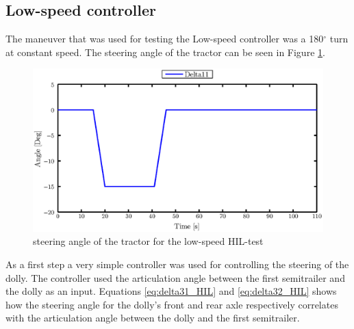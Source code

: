 \documentclass[ExampleMasters.tex]{subfiles}
\begin{document}
%	

\subsection{Low-speed controller}
The maneuver that was used for testing the Low-speed controller was a 180$^{\circ}$ turn at constant speed. The steering angle of the tractor can be seen in Figure \ref{fig:HIL002_delta11}.\\
\begin{figure}[!htb]
	\centering
	\includegraphics[width=0.7\linewidth]{figures/HIL_delta11}
	\caption{steering angle of the tractor for the low-speed \acrlong{HIL}-test}
	
	\label{fig:HIL002_delta11}
\end{figure}
As a first step a very simple controller was used for controlling the steering of the dolly. The controller used the articulation angle between the first semitrailer and the dolly as an input. Equations \eqref{eq:delta31_HIL} and \eqref{eq:delta32_HIL} shows how the steering angle for the dolly's front and rear axle respectively correlates with the articulation angle between the dolly and the first semitrailer.
\end{document}
